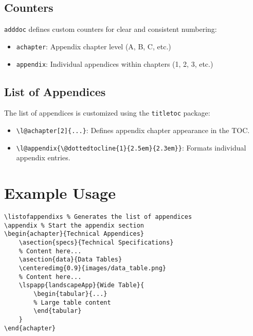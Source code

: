 \documentclass[12pt,twoside]{report}
\begin{document}
\subsection{Counters}
\texttt{adddoc} defines custom counters for clear and consistent numbering:
\begin{itemize}
    \item \texttt{achapter}: Appendix chapter level (A, B, C, etc.)
    \item \texttt{appendix}: Individual appendices within chapters (1, 2, 3, etc.)
\end{itemize}

\subsection{List of Appendices}
The list of appendices is customized using the \texttt{titletoc} package:
\begin{itemize}
    \item \verb|\l@achapter[2]{...}|: Defines appendix chapter appearance in the TOC.
    \item \verb|\l@appendix{\@dottedtocline{1}{2.5em}{2.3em}}|: Formats individual appendix entries.
\end{itemize}

\section{Example Usage}

\begin{verbatim}
\listofappendixs % Generates the list of appendices
\appendix % Start the appendix section
\begin{achapter}{Technical Appendices}
    \asection{specs}{Technical Specifications}
    % Content here...
    \asection{data}{Data Tables}
    \centeredimg{0.9}{images/data_table.png}
    % Content here...
    \lspapp{landscapeApp}{Wide Table}{
        \begin{tabular}{...}
        % Large table content
        \end{tabular}
    }
\end{achapter}
\end{verbatim}
\newpage

\renewcommand{\tcc}[1]{\texttt{\*\hspace{0.5cm}#1\hspace{0.5cm}*/}}
\end{document}
